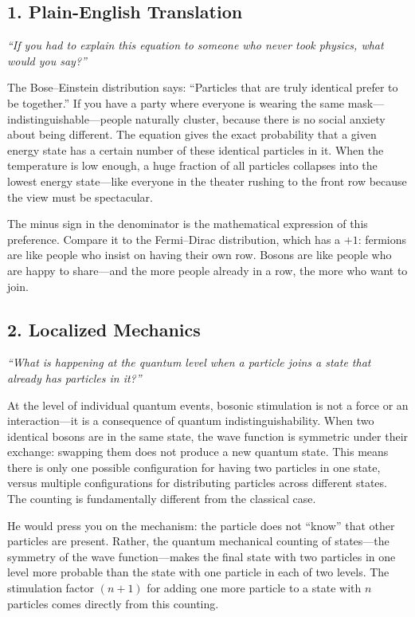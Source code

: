 \documentclass[11pt,openright]{book}
\begin{document}
\subsection*{1. Plain-English Translation}
\textit{``If you had to explain this equation to someone who never took physics, what would you say?''}

The Bose--Einstein distribution says: ``Particles that are truly identical prefer to be together.'' If you have a party where everyone is wearing the same mask---indistinguishable---people naturally cluster, because there is no social anxiety about being different. The equation gives the exact probability that a given energy state has a certain number of these identical particles in it. When the temperature is low enough, a huge fraction of all particles collapses into the lowest energy state---like everyone in the theater rushing to the front row because the view must be spectacular.

The minus sign in the denominator is the mathematical expression of this preference. Compare it to the Fermi--Dirac distribution, which has a $+1$: fermions are like people who insist on having their own row. Bosons are like people who are happy to share---and the more people already in a row, the more who want to join.

\subsection*{2. Localized Mechanics}
\textit{``What is happening at the quantum level when a particle joins a state that already has particles in it?''}

At the level of individual quantum events, bosonic stimulation is not a force or an interaction---it is a consequence of quantum indistinguishability. When two identical bosons are in the same state, the wave function is symmetric under their exchange: swapping them does not produce a new quantum state. This means there is only one possible configuration for having two particles in one state, versus multiple configurations for distributing particles across different states. The counting is fundamentally different from the classical case.

He would press you on the mechanism: the particle does not ``know'' that other particles are present. Rather, the quantum mechanical counting of states---the symmetry of the wave function---makes the final state with two particles in one level more probable than the state with one particle in each of two levels. The stimulation factor $(n+1)$ for adding one more particle to a state with $n$ particles comes directly from this counting.
\end{document}
